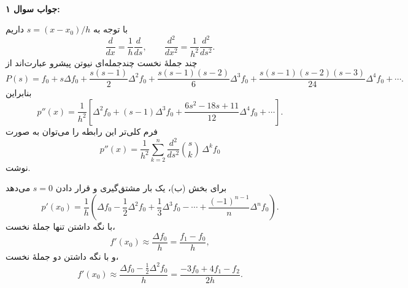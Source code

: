 \\
\textbf{جواب سوال ۱:}

با توجه به
\(s=(x-x_0)/h\)
داریم
\[
 \frac{d}{dx}=\frac{1}{h}\frac{d}{ds},
 \qquad
 \frac{d^2}{dx^2}=\frac{1}{h^2}\frac{d^2}{ds^2}.
\]
چند جملهٔ نخست چندجمله‌ای نیوتن پیشرو عبارت‌اند از
\[
 P(s)=f_0+s\Delta f_0+\frac{s(s-1)}{2}\Delta^2f_0
 +\frac{s(s-1)(s-2)}{6}\Delta^3f_0
 +\frac{s(s-1)(s-2)(s-3)}{24}\Delta^4f_0+\cdots.
\]
بنابراین
\[
 p''(x)=\frac{1}{h^2}\left[
 \Delta^2f_0+(s-1)\Delta^3f_0
 +\frac{6s^2-18s+11}{12}\Delta^4f_0+\cdots
 \right].
\]
فرم کلی‌تر این رابطه را می‌توان به صورت
\[
 p''(x)=\frac{1}{h^2}
 \sum_{k=2}^{n}
 \frac{d^2}{ds^2}\binom{s}{k}\,\Delta^k f_0
\]
نوشت.

برای بخش (ب)، یک بار مشتق‌گیری و قرار دادن
\(s=0\)
می‌دهد
\[
 p'(x_0)=\frac{1}{h}\left(
 \Delta f_0-\frac{1}{2}\Delta^2f_0
 +\frac{1}{3}\Delta^3f_0-\cdots
 +\frac{(-1)^{n-1}}{n}\Delta^n f_0
 \right).
\]
با نگه داشتن تنها جملهٔ نخست،
\[
 f'(x_0)\approx\frac{\Delta f_0}{h}
 =\frac{f_1-f_0}{h},
\]
و با نگه داشتن دو جملهٔ نخست،
\[
 f'(x_0)\approx\frac{\Delta f_0-\frac12\Delta^2f_0}{h}
 =\frac{-3f_0+4f_1-f_2}{2h}.
\]
